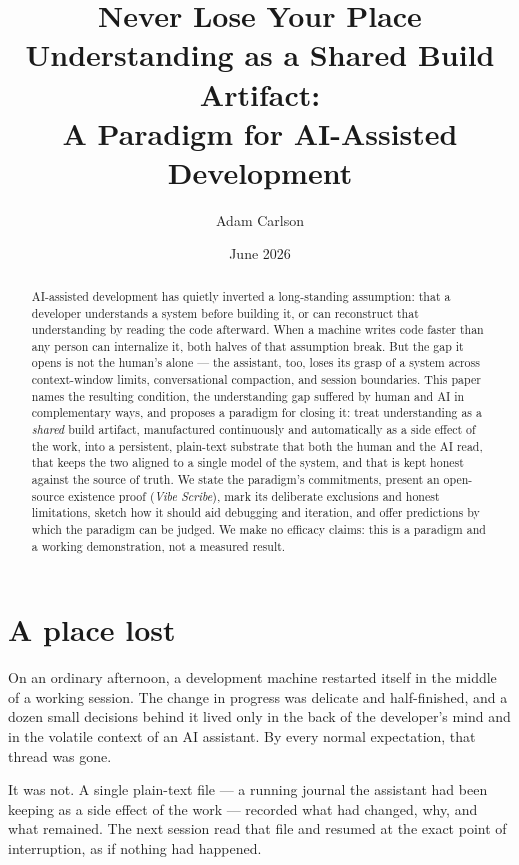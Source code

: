 \documentclass[11pt]{article}
\title{\textbf{Never Lose Your Place}\\[0.45em]
  {\large Understanding as a Shared Build Artifact:\\[0.15em]
  A Paradigm for AI-Assisted Development}}
\author{Adam Carlson}
\date{June 2026}
\newcommand{\vs}{\textit{Vibe Scribe}}
\begin{document}
\maketitle

\begin{abstract}
\noindent
AI-assisted development has quietly inverted a long-standing assumption: that a developer
understands a system before building it, or can reconstruct that understanding by reading the
code afterward. When a machine writes code faster than any person can internalize it, both halves
of that assumption break. But the gap it opens is not the human's alone --- the assistant, too,
loses its grasp of a system across context-window limits, conversational compaction, and session
boundaries. This paper names the resulting condition, the understanding gap suffered by human and
AI in complementary ways, and proposes a paradigm for closing it: treat understanding as a
\emph{shared} build artifact, manufactured continuously and automatically as a side effect of the
work, into a persistent, plain-text substrate that both the human and the AI read, that keeps the
two aligned to a single model of the system, and that is kept honest against the source of truth.
We state the paradigm's commitments, present an open-source existence proof (\vs{}), mark its
deliberate exclusions and honest limitations, sketch how it should aid debugging and iteration,
and offer predictions by which the paradigm can be judged. We make no efficacy claims: this is a
paradigm and a working demonstration, not a measured result.
\end{abstract}

\section{A place lost}

On an ordinary afternoon, a development machine restarted itself in the middle of a working
session. The change in progress was delicate and half-finished, and a dozen small decisions behind
it lived only in the back of the developer's mind and in the volatile context of an AI assistant.
By every normal expectation, that thread was gone.

It was not. A single plain-text file --- a running journal the assistant had been keeping as a
side effect of the work --- recorded what had changed, why, and what remained. The next session
read that file and resumed at the exact point of interruption, as if nothing had happened.
\end{document}
